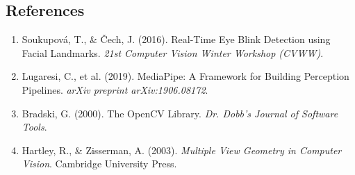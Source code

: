\documentclass[11pt,a4paper]{article}
\begin{document}
\subsection{References}
\begin{enumerate}
    \item Soukupov\'{a}, T., \& \v{C}ech, J. (2016). Real-Time Eye Blink Detection using Facial Landmarks. \textit{21st Computer Vision Winter Workshop (CVWW)}.
    \item Lugaresi, C., et al. (2019). MediaPipe: A Framework for Building Perception Pipelines. \textit{arXiv preprint arXiv:1906.08172}.
    \item Bradski, G. (2000). The OpenCV Library. \textit{Dr. Dobb's Journal of Software Tools}.
    \item Hartley, R., \& Zisserman, A. (2003). \textit{Multiple View Geometry in Computer Vision}. Cambridge University Press.
\end{enumerate}
\end{document}
